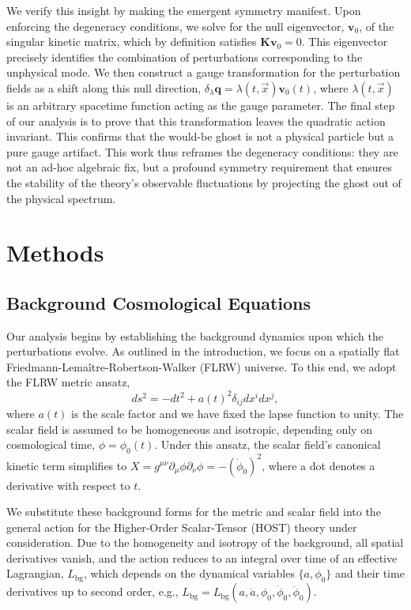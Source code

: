 \documentclass[twocolumn]{aastex631}
\begin{document}
We verify this insight by making the emergent symmetry manifest. Upon enforcing the degeneracy conditions, we solve for the null eigenvector, $\mathbf{v}_0$, of the singular kinetic matrix, which by definition satisfies $\mathbf{K}\mathbf{v}_0 = 0$. This eigenvector precisely identifies the combination of perturbations corresponding to the unphysical mode. We then construct a gauge transformation for the perturbation fields as a shift along this null direction, $\delta_\lambda \mathbf{q} = \lambda(t, \vec{x}) \mathbf{v}_0(t)$, where $\lambda(t, \vec{x})$ is an arbitrary spacetime function acting as the gauge parameter. The final step of our analysis is to prove that this transformation leaves the quadratic action invariant. This confirms that the would-be ghost is not a physical particle but a pure gauge artifact. This work thus reframes the degeneracy conditions: they are not an ad-hoc algebraic fix, but a profound symmetry requirement that ensures the stability of the theory's observable fluctuations by projecting the ghost out of the physical spectrum.


\section{Methods}
\label{sec:methods}
\subsection{Background Cosmological Equations}
Our analysis begins by establishing the background dynamics upon which the perturbations evolve. As outlined in the introduction, we focus on a spatially flat Friedmann-Lema\^itre-Robertson-Walker (FLRW) universe. To this end, we adopt the FLRW metric ansatz,
\begin{equation}
ds^2 = -dt^2 + a(t)^2 \delta_{ij} dx^i dx^j,
\end{equation}
where $a(t)$ is the scale factor and we have fixed the lapse function to unity. The scalar field is assumed to be homogeneous and isotropic, depending only on cosmological time, $\phi = \phi_0(t)$. Under this ansatz, the scalar field's canonical kinetic term simplifies to $X = g^{\mu\nu}\partial_\mu\phi\partial_\nu\phi = -(\dot{\phi}_0)^2$, where a dot denotes a derivative with respect to $t$.

We substitute these background forms for the metric and scalar field into the general action for the Higher-Order Scalar-Tensor (HOST) theory under consideration. Due to the homogeneity and isotropy of the background, all spatial derivatives vanish, and the action reduces to an integral over time of an effective Lagrangian, $L_{\text{bg}}$, which depends on the dynamical variables $\{a, \phi_0\}$ and their time derivatives up to second order, e.g., $L_{\text{bg}} = L_{\text{bg}}(a, \dot{a}, \phi_0, \dot{\phi}_0, \ddot{\phi}_0)$.
\end{document}
